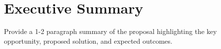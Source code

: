 \section{Executive Summary}

\begin{keyinsight}
Provide a 1-2 paragraph summary of the proposal highlighting the key opportunity, proposed solution, and expected outcomes.
\end{keyinsight}


